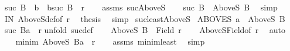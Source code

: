 \begin{isabellebody}
\ {\isachardoublequoteopen}suc\ B\ {\isasymnoteq}\ b\ {\isasymand}\ {\isacharparenleft}{\kern0pt}b{\isacharcomma}{\kern0pt}suc\ B{\isacharparenright}{\kern0pt}\ {\isasymin}\ r{\isachardoublequoteclose}\isanewline
%
\isadelimproof
%
\endisadelimproof
%
\isatagproof
{}\isamarkupfalse%
{\isacharminus}{\kern0pt}\isanewline
\ \ \isamarkupfalse%
\ assms\ suc{\isacharunderscore}{\kern0pt}AboveS\isanewline
\ \ \isamarkupfalse%
\ {\isachardoublequoteopen}suc\ B\ {\isasymin}\ AboveS\ B{\isachardoublequoteclose}\ \isamarkupfalse%
\ simp\isanewline
\ \ \isamarkupfalse%
\ IN\ AboveS{\isacharunderscore}{\kern0pt}def{\isacharbrackleft}{\kern0pt}of\ r{\isacharbrackright}{\kern0pt}\ \isamarkupfalse%
\ {\isacharquery}{\kern0pt}thesis\ \isamarkupfalse%
\ simp\isanewline
{}\isamarkupfalse%
%
\endisatagproof
{\isafoldproof}%
%
\isadelimproof
\isanewline
%
\endisadelimproof
\isanewline
{}\isamarkupfalse%
\ suc{\isacharunderscore}{\kern0pt}least{\isacharunderscore}{\kern0pt}AboveS{\isacharcolon}{\kern0pt}\isanewline
{}\ ABOVES{\isacharcolon}{\kern0pt}\ {\isachardoublequoteopen}a\ {\isasymin}\ AboveS\ B{\isachardoublequoteclose}\isanewline
{}\ {\isachardoublequoteopen}{\isacharparenleft}{\kern0pt}suc\ B{\isacharcomma}{\kern0pt}a{\isacharparenright}{\kern0pt}\ {\isasymin}\ r{\isachardoublequoteclose}\isanewline
%
\isadelimproof
%
\endisadelimproof
%
\isatagproof
{}\isamarkupfalse%
{\isacharparenleft}{\kern0pt}unfold\ suc{\isacharunderscore}{\kern0pt}def{\isacharparenright}{\kern0pt}\isanewline
\ \ \isamarkupfalse%
\ {\isachardoublequoteopen}AboveS\ B\ {\isasymle}\ Field\ r{\isachardoublequoteclose}\isanewline
\ \ \isamarkupfalse%
\ AboveS{\isacharunderscore}{\kern0pt}Field{\isacharbrackleft}{\kern0pt}of\ r{\isacharbrackright}{\kern0pt}\ \isamarkupfalse%
\ auto\isanewline
\ \ \isamarkupfalse%
\ {\isachardoublequoteopen}{\isacharparenleft}{\kern0pt}minim\ {\isacharparenleft}{\kern0pt}AboveS\ B{\isacharparenright}{\kern0pt}{\isacharcomma}{\kern0pt}a{\isacharparenright}{\kern0pt}\ {\isasymin}\ r{\isachardoublequoteclose}\isanewline
\ \ \isamarkupfalse%
\ assms\ minim{\isacharunderscore}{\kern0pt}least\ \isamarkupfalse%
\ simp\isanewline
{}\isamarkupfalse%
%
\endisatagproof
{\isafoldproof}%
%
\isadelimproof
\isanewline
%
\endisadelimproof
\isanewline
{}\isamarkupfalse%

\end{isabellebody}

